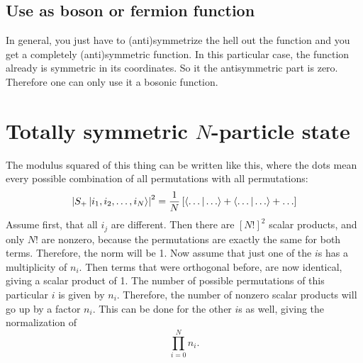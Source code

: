 \documentclass[11pt, english, fleqn, DIV=15, headinclude, BCOR=1.5cm]{scrartcl}
\begin{document}

\subsection{Use as boson or fermion function}

In general, you just have to (anti)symmetrize the hell out the function and you
get a completely (anti)symmetric function. In this particular case, the
function already is symmetric in its coordinates. So it the antisymmetric part
is zero. Therefore one can only use it a bosonic function.

\section{Totally symmetric $N$-particle state}

The modulus squared of this thing can be written like this, where the dots mean
every possible combination of all permutations with all permutations:
\[
    \left| S_+ \ket{i_1, i_2, \ldots, i_N} \right|^2
    = \frac{1}{N} \left[ 
        \braket{\ldots | \ldots}
        +
        \braket{\ldots | \ldots}
        +
        \ldots
     \right]
\]
Assume first, that all $i_j$ are different. Then there are $[N!]^2$ scalar
products, and only $N!$ are nonzero, because the permutations are exactly the
same for both terms. Therefore, the norm will be 1. Now assume that just one of
the $i$s has a multiplicity of $n_i$. Then terms that were orthogonal before,
are now identical, giving a scalar product of 1. The number of possible
permutations of this particular $i$ is given by $n_i$. Therefore, the number of
nonzero scalar products will go up by a factor $n_i$. This can be done for the
other $i$s as well, giving the normalization of
\[
    \prod_{i = 0}^N n_i.
\]
\end{document}
